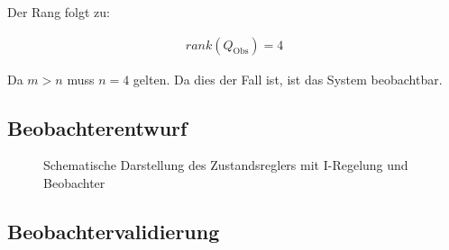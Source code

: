 \documentclass[
	pagesize,
	fontsize=12pt,
	paper=a4,
	oneside,
   reqno
]{scrartcl}
\begin{document}
Der Rang folgt zu:

\begin{align}
    rank(Q_{\mathrm{Obs}}) = 4
\end{align}

Da $m > n$ muss $n = 4$ gelten. Da dies der Fall ist, ist das System beobachtbar.

\subsection{Beobachterentwurf}

\begin{figure}[H]
    \centering
    \caption[Reglerstruktur mit Beobachter]{Schematische Darstellung des Zustandsreglers mit I-Regelung und Beobachter}
    \label{fig:Bild35}
\end{figure}

\subsection{Beobachtervalidierung}

\newpage
\newcount\Quellennummer
{}

\renewcommand\refname{Literaturverzeichnis}
\end{document}
